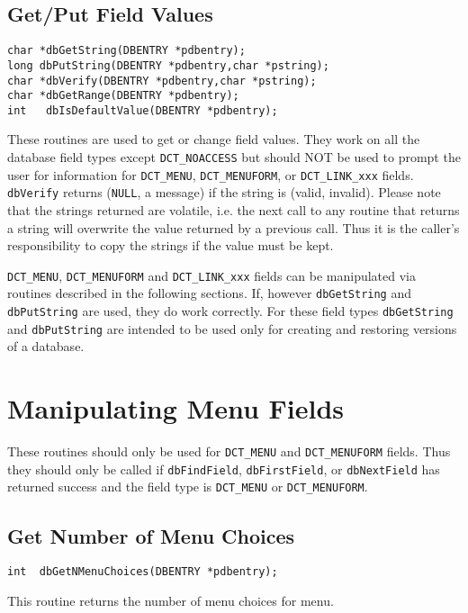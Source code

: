 \subsection{Get/Put Field Values}

\begin{verbatim}char *dbGetString(DBENTRY *pdbentry);
long dbPutString(DBENTRY *pdbentry,char *pstring);
char *dbVerify(DBENTRY *pdbentry,char *pstring);
char *dbGetRange(DBENTRY *pdbentry);
int   dbIsDefaultValue(DBENTRY *pdbentry);
\end{verbatim}
These routines are used to get or change field values. They work on all the database field types except \verb|DCT_NOACCESS| 
but should NOT be used to prompt the user for information for \verb|DCT_MENU|, \verb|DCT_MENUFORM|, or \verb|DCT_LINK_xxx| fields. 
\verb|dbVerify| returns (\verb|NULL|, a message) if the string is (valid, invalid). Please note that the strings returned are volatile, i.e. 
the next call to any routine that returns a string will overwrite the value returned by a previous call. Thus it is the caller's 
responsibility to copy the strings if the value must be kept.

\verb|DCT_MENU|, \verb|DCT_MENUFORM| and \verb|DCT_LINK_xxx| fields can be manipulated via routines described in the following 
sections. If, however \verb|dbGetString| and \verb|dbPutString| are used, they do work correctly. For these field types 
\verb|dbGetString| and \verb|dbPutString| are intended to be used only for creating and restoring versions of a database.

\section{Manipulating Menu Fields}

These routines should only be used for \verb|DCT_MENU| and \verb|DCT_MENUFORM| fields. Thus they should only be called if 
\verb|dbFindField|, \verb|dbFirstField|, or \verb|dbNextField| has returned success and the field type is \verb|DCT_MENU| or 
\verb|DCT_MENUFORM|.

\subsection{Get Number of Menu Choices}

\begin{verbatim}int  dbGetNMenuChoices(DBENTRY *pdbentry);
\end{verbatim}This routine returns the number of menu choices for menu.

